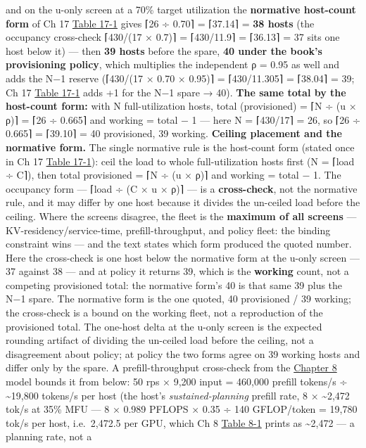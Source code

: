 and on the u-only screen at a 70\% target utilization the
\textbf{normative host-count form} of Ch 17 \hyperref[tab:17.1]{Table 17-1} gives ⌈26 ÷ 0.70⌉
= ⌈37.14⌉ = \textbf{38 hosts} (the occupancy cross-check ⌈430/(17 ×
0.7)⌉ = ⌈430/11.9⌉ = ⌈36.13⌉ = 37 sits one host below it) --- then
\textbf{39 hosts} before the spare, \textbf{40 under the book's
provisioning policy}, which multiplies the independent ρ = 0.95 as well
and adds the N−1 reserve (⌈430/(17 × 0.70 × 0.95)⌉ = ⌈430/11.305⌉ =
⌈38.04⌉ = 39; Ch 17 \hyperref[tab:17.1]{Table 17-1} adds +1 for the N−1 spare → 40).
\textbf{The same total by the host-count form:} with N full-utilization
hosts, total (provisioned) = ⌈N ÷ (u × ρ)⌉ = ⌈26 ÷ 0.665⌉ and working =
total − 1 --- here N = ⌈430/17⌉ = 26, so ⌈26 ÷ 0.665⌉ = ⌈39.10⌉ = 40
provisioned, 39 working. \textbf{Ceiling placement and the normative
form.} The single normative rule is the host-count form (stated once in
Ch 17 \hyperref[tab:17.1]{Table 17-1}): ceil the load to whole full-utilization hosts first
(N = ⌈load ÷ C⌉), then total provisioned = ⌈N ÷ (u × ρ)⌉ and working =
total − 1. The occupancy form --- ⌈load ÷ (C × u × ρ)⌉ --- is a
\textbf{cross-check}, not the normative rule, and it may differ by one
host because it divides the un-ceiled load before the ceiling. Where the
screens disagree, the fleet is the \textbf{maximum of all screens} ---
KV-residency/service-time, prefill-throughput, and policy fleet: the
binding constraint wins --- and the text states which form produced the
quoted number. Here the cross-check is one host below the normative form
at the u-only screen --- 37 against 38 --- and at policy it returns 39,
which is the \textbf{working} count, not a competing provisioned total:
the normative form's 40 is that same 39 plus the N−1 spare. The
normative form is the one quoted, 40 provisioned / 39 working; the
cross-check is a bound on the working fleet, not a reproduction of the
provisioned total. The one-host delta at the u-only screen is the
expected rounding artifact of dividing the un-ceiled load before the
ceiling, not a disagreement about policy; at policy the two forms agree
on 39 working hosts and differ only by the spare. A prefill-throughput
cross-check from the \hyperref[chap:8]{Chapter 8} model bounds it from below: 50 rps ×
9,200 input = 460,000 prefill tokens/s ÷ \textasciitilde19,800 tokens/s
per host (the host's \emph{sustained-planning} prefill rate, 8 ×
\textasciitilde2,472 tok/s at 35\% MFU --- 8 × 0.989 PFLOPS × 0.35 ÷ 140
GFLOP/token = 19,780 tok/s per host, i.e.~2,472.5 per GPU, which Ch 8
\hyperref[tab:8.1]{Table 8-1} prints as \textasciitilde2,472 --- a planning rate, not a
